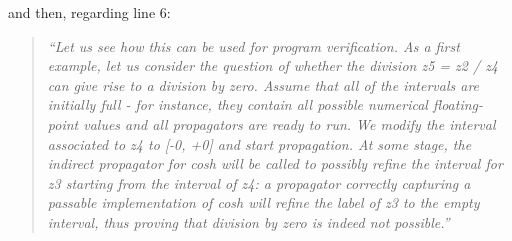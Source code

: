 and then, regarding line 6:
\begin{quote}
\itshape
``Let us see how this can be used for program verification. As a first example, let us consider the question of whether the division z5 = z2 / z4 can give rise to a division by zero. Assume that all of the intervals are initially full - for instance, they contain all possible numerical floating-point values and all propagators are ready to run. We modify the interval associated to z4 to [-0, +0] and start propagation. At some stage, the indirect propagator for cosh will be called to possibly refine the interval for z3 starting from the interval of z4: a propagator correctly capturing a passable implementation of cosh will refine the label of z3 to the empty interval, thus proving that division by zero is indeed not possible.''
\end{quote}

